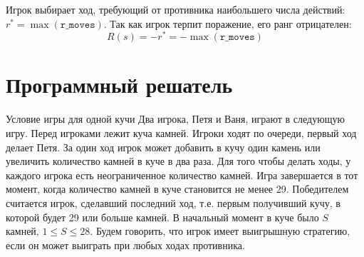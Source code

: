 \documentclass[11pt,a4paper]{article}
\begin{document}
Игрок выбирает ход, требующий от противника наибольшего числа действий: $r^* = \max(\texttt{r\_moves})$. Так как игрок терпит поражение, его ранг отрицателен:
$$R(s) = -r^* = -\max(\texttt{r\_moves})$$

\section{Программный решатель}

\begin{taskbox}{Условие игры для одной кучи}
Два игрока, Петя и Ваня, играют в следующую игру. Перед игроками лежит куча камней. Игроки ходят по очереди, первый ход делает Петя.
За один ход игрок может добавить в кучу один камень или увеличить количество камней в куче в два раза. Для того чтобы делать ходы, у каждого игрока есть неограниченное количество камней.
Игра завершается в тот момент, когда количество камней в куче становится не менее 29. Победителем считается игрок, сделавший последний ход, т.е. первым получивший кучу, в которой будет 29 или больше камней.
В начальный момент в куче было $S$ камней, $1 \le S \le 28$. Будем говорить, что игрок имеет выигрышную стратегию, если он может выиграть при любых ходах противника.
\end{taskbox}
\end{document}

